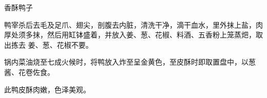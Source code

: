 %
%
%
%
%
%
%
\begin{recipe}{香酥鸭子}

\ingredients


\preparation

\step 鸭宰杀后去毛及足爪、翅尖，剖腹去内脏，清洗干净，滴干血水，里外抹上盐，肉
厚处须多抹，然后用缸钵盛着，并放入姜、葱、花椒、料酒、五香粉上笼蒸𤆵，取出拣去
姜、葱、花椒不要。

\step 锅内菜油烧至七成火候时，将鸭放入炸至呈金黄色，至皮酥时即取置盘中，以葱
酱、花卷佐食。

\features

此鸭皮酥肉嫩，色泽美观。

\end{recipe}

